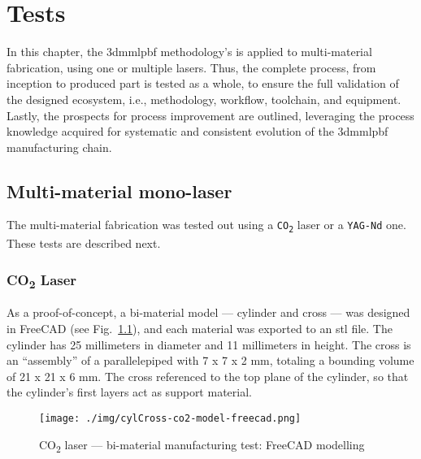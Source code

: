 %
%
\chapter{Tests}%
\label{ch:application}
In this chapter, the \gls{3dmmlpbf} methodology's is applied to multi-material
fabrication, using one or multiple lasers.
Thus, the complete process, from inception to produced part is tested as a
whole, to ensure the full validation of the designed ecosystem, i.e.,
methodology, workflow, toolchain, and equipment.
Lastly, the prospects for process improvement are outlined, leveraging the
process knowledge acquired for systematic and consistent evolution of the
\gls{3dmmlpbf} manufacturing chain.

\section{Multi-material mono-laser}%
\label{sec:multi-material-mono-laser}
The multi-material fabrication was tested out using a
\texttt{CO\textsubscript{2}} laser or a \texttt{YAG-Nd} one. These tests are
described next.

\subsection{CO\textsubscript{2} Laser}%
\label{sec:co2-laser-test}
As a proof-of-concept, a bi-material model --- cylinder and cross --- was
designed in FreeCAD (see Fig.~\ref{fig:cylCross-co2-model-freecad}), and each material was exported to an \gls{stl} file. The
cylinder has 25 millimeters in diameter and 11 millimeters in height. The cross
is an ``assembly'' of a parallelepiped with 7 x 7 x 2 mm, totaling a bounding
volume of 21 x 21 x 6 mm. The cross
referenced to the top plane of the cylinder, so that the cylinder's first layers
act as support material.

\begin{figure}[htbp!]
  \centering
  \texttt{[image: ./img/cylCross-co2-model-freecad.png]}
  \caption{CO\textsubscript{2} laser --- bi-material manufacturing test: FreeCAD modelling}%
  \label{fig:cylCross-co2-model-freecad}
\end{figure}

